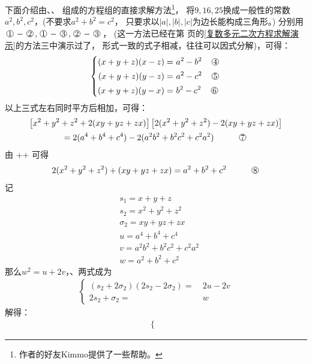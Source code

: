 \begin{enumerate}[label={【\textbf{例\thechapter.\arabic*}】},
 leftmargin=\inteval{\myenumleftmargin}pt,
 itemsep=\inteval{\myenumitempsep}pt,
 itemindent=\inteval{\myenumitemindent}pt]
下面介绍由、、
组成的方程组的直接求解方法\footnote{作者的好友Kimmo提供了一些帮助。}，
将$ 9,16,25 $换成一般性的常数$ a^2,b^2,c^2 $，(不要求$ a^2+b^2=c^2 $，
只要求以$ |a|,|b|,|c| $为边长能构成三角形。)
分别用$ \mycircled{1}-\mycircled{2},
\mycircled{1}-\mycircled{3},\mycircled{2}-\mycircled{3} $，
(这一方法已经在第\pageref{复数多元二次方程求解演示} 
页的\ref{复数多元二次方程求解演示}的方法三中演示过了，
形式一致的式子相减，往往可以因式分解)，可得：
\begin{align*}
    \left\{
    \begin{aligned}
        (x+y+z)(x-z)=&\ a^2-b^2 \q \mycircled{4}  \\
        (x+y+z)(y-z)=&\ a^2-c^2 \q \mycircled{5}  \\
        (x+y+z)(y-x)=&\ b^2-c^2 \q \mycircled{6} 
    \end{aligned}
    \right.
\end{align*}
以上三式左右同时平方后相加，可得：
\begin{gather*}
    \left[ x^2+y^2+z^2+2(xy+yz+zx) \right] \left[ 2(x^2+y^2+z^2)-2(xy+yz+zx) \right] \\
    =2(a^4+b^4+c^4)-2(a^2b^2+b^2c^2+c^2a^2) \hspace{1cm} \mycircled{7}
\end{gather*}
由 ++ 可得
\begin{align*}
    2(x^2+y^2+z^2)+(xy+yz+zx)=a^2+b^2+c^2  \hspace{1cm} \mycircled{8}
\end{align*}
记
\begin{align*}
    & s_1=x+y+z \\
    & s_2=x^2+y^2+z^2 \\
    & \sigma_2=xy+yz+zx  \\
    & u=a^4+b^4+c^4 \\
    & v=a^2b^2+b^2c^2+c^2a^2 \\
    & w=a^2+b^2+c^2
\end{align*}
那么$ w^2=u+2v $，、两式成为
\begin{align*}
    \left\{
    \begin{aligned}
        (s_2+2\sigma_2)(2s_2-2\sigma_2)=&\ 2u-2v \\
        2s_2+\sigma_2 =&\ w
    \end{aligned}
    \right.
\end{align*}
解得：
\begin{align*}
    \left\{
    \begin{aligned}

\end{aligned}
\end{align*}
\end{enumerate}
